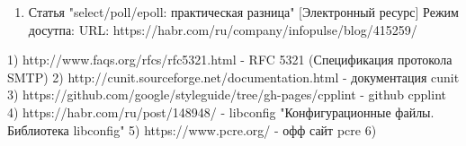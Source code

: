 \documentclass[a4paper,12pt]{report}
\begin{document}
\begin{enumerate}
	\item Статья "select/poll/epoll: практическая разница" [Электронный ресурс] Режим досутпа: URL: https://habr.com/ru/company/infopulse/blog/415259/
	
\end{enumerate}

1) http://www.faqs.org/rfcs/rfc5321.html - RFC 5321 (Спецификация протокола SMTP)
2) http://cunit.sourceforge.net/documentation.html - документация cunit 
3) https://github.com/google/styleguide/tree/gh-pages/cpplint - github cpplint
4) https://habr.com/ru/post/148948/ - libconfig "Конфигурационные файлы. Библиотека libconfig"
5) https://www.pcre.org/ - офф сайт pcre 
6) 

\lstlistoflistings
\end{document}

